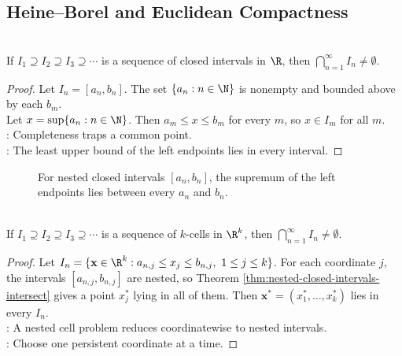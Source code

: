 \subsection{Heine--Borel and Euclidean Compactness}

\begin{theorem} \label{thm:nested-closed-intervals-intersect} \\
If $I_1\supseteq I_2\supseteq I_3\supseteq\cdots$ is a sequence of closed intervals in $\R$, then $\bigcap_{n=1}^{\infty}I_n\neq\emptyset$.
\begin{proof}
Let $I_n=[a_n,b_n]$. The set $\{a_n:n\in\N\}$ is nonempty and bounded above by each $b_m$.\\
Let $x=\sup\{a_n:n\in\N\}$. Then $a_m\leq x\leq b_m$ for every $m$, so $x\in I_m$ for all $m$.\\
: Completeness traps a common point.\\
: The least upper bound of the left endpoints lies in every interval.
\end{proof}
\end{theorem}

\begin{figure}[H]
  \centering
  
  \caption{For nested closed intervals $[a_n,b_n]$, the supremum of the left endpoints lies between every $a_n$ and $b_n$.}
  \label{fig:nested-closed-intervals-lub}
\end{figure}

\begin{theorem} \label{thm:nested-k-cells-intersect} \\
If $I_1\supseteq I_2\supseteq I_3\supseteq\cdots$ is a sequence of $k$-cells in $\R^k$, then $\bigcap_{n=1}^{\infty}I_n\neq\emptyset$.
\begin{proof}
Let $I_n=\{\mathbf{x}\in\R^k:a_{n,j}\leq x_j\leq b_{n,j},\ 1\leq j\leq k\}$. For each coordinate $j$, the intervals $[a_{n,j},b_{n,j}]$ are nested, so Theorem \ref{thm:nested-closed-intervals-intersect} gives a point $x_j^*$ lying in all of them. Then $\mathbf{x}^*=(x_1^*,\ldots,x_k^*)$ lies in every $I_n$.\\
: A nested cell problem reduces coordinatewise to nested intervals.\\
: Choose one persistent coordinate at a time.
\end{proof}
\end{theorem}


